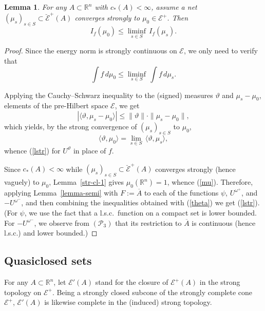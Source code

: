 \documentclass[12pt,a4paper,reqno]{amsart} %
\theoremstyle{lause}
\theoremstyle{maaritelma}
\theoremstyle{lause}
\newtheorem{lemma}[theorem]{Lemma}
\theoremstyle{maaritelma}
\numberwithin{equation}{section}
\begin{document}
\begin{lemma}\label{l-str-sem} For any $A\subset\mathbb R^n$ with $c_*(A)<\infty$, assume a net $(\mu_s)_{s\in S}\subset\breve{\mathcal E}^+(A)$ converges strongly to $\mu_0\in\mathcal E^+$. Then
\begin{equation*}\label{en-conv}
 I_f(\mu_0)\leqslant\liminf_{s\in S}\,I_f(\mu_s).
\end{equation*}
\end{lemma}

\begin{proof} Since the energy norm is strongly continuous on $\mathcal E$, we only need to verify that
\begin{equation}\label{lstr}
 \int f\,d\mu_0\leqslant\liminf_{s\in S}\,\int f\,d\mu_s.
\end{equation}

Applying the Cauchy--Schwarz inequality to the (signed) measures $\vartheta$ and $\mu_s-\mu_0$, elements of the pre-Hil\-bert space $\mathcal E$, we get
\[\left|\langle\vartheta,\mu_s-\mu_0\rangle\right|\leqslant\|\vartheta\|\cdot\|\mu_s-\mu_0\|,\]
which yields, by the strong convergence of $(\mu_s)_{s\in S}$ to $\mu_0$,
\begin{equation}\label{theta}
\langle\vartheta,\mu_0\rangle=\lim_{s\in S}\,\langle\vartheta,\mu_s\rangle,
\end{equation}
whence (\ref{lstr}) for $U^\vartheta$ in place of $f$.

Since $c_*(A)<\infty$ while $(\mu_s)_{s\in S}\subset\breve{\mathcal E}^+(A)$ converges strongly (hence vaguely) to $\mu_0$,  Lemma~\ref{str-cl-1} gives $\mu_0(\mathbb R^n)=1$, whence (\ref{mu}). Therefore, applying Lemma~\ref{lemma-semi} with $F:=\overline{A}$ to each of the functions $\psi$, $U^{\omega^+}$, and $-U^{\omega^-}$, and then combining the inequalities obtained with (\ref{theta}) we get (\ref{lstr}). (For $\psi$, we use the fact that a l.s.c.\ function on a compact set is lower bounded. For $-U^{\omega^-}$, we observe from $(\mathcal P_3)$ that its restriction to $\overline{A}$ is continuous (hence l.s.c.) and lower bounded.)
\end{proof}

\subsection{Quasiclosed sets}\label{secqu} For any $A\subset\mathbb R^n$, let $\mathcal E'(A)$ stand for the closure of $\mathcal E^+(A)$ in the strong topology on $\mathcal E^+$. Being a strongly closed subcone of the strongly complete cone $\mathcal E^+$, $\mathcal E'(A)$ is likewise complete in the (induced) strong topology.
\end{document}
